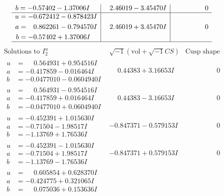 \documentclass[1p]{elsarticle_modified}
\theoremstyle{definition}
\newcommand{\I}{\sqrt{-1}}
\begin{document}
$$\begin{array}{c|c|c}
\begin{aligned}
b &= -0.57402 - 1.37006 I\end{aligned}
 & \phantom{-}2.46019 - 3.45470 I & \phantom{-0.000000 } 0 \\ \hline\begin{aligned}
u &= -0.672412 - 0.878423 I \\
a &= \phantom{-}0.862261 - 0.794570 I \\
b &= -0.57402 + 1.37006 I\end{aligned}
 & \phantom{-}2.46019 + 3.45470 I & \phantom{-0.000000 } 0\\
 \hline 
 \end{array}$$\newpage$$\begin{array}{c|c|c}  
\text{Solutions to }I^u_{2}& \I (\text{vol} + \sqrt{-1}CS) & \text{Cusp shape}\\
 \hline 
\begin{aligned}
u &= \phantom{-}0.564931 + 0.954516 I \\
a &= -0.417859 - 0.016464 I \\
b &= -0.0477010 - 0.0604940 I\end{aligned}
 & \phantom{-}0.44383 + 3.16653 I & \phantom{-0.000000 } 0 \\ \hline\begin{aligned}
u &= \phantom{-}0.564931 - 0.954516 I \\
a &= -0.417859 + 0.016464 I \\
b &= -0.0477010 + 0.0604940 I\end{aligned}
 & \phantom{-}0.44383 - 3.16653 I & \phantom{-0.000000 } 0 \\ \hline\begin{aligned}
u &= -0.452391 + 1.015630 I \\
a &= -0.71504 - 1.98517 I \\
b &= -1.13769 + 1.76536 I\end{aligned}
 & -0.847371 - 0.579153 I & \phantom{-0.000000 } 0 \\ \hline\begin{aligned}
u &= -0.452391 - 1.015630 I \\
a &= -0.71504 + 1.98517 I \\
b &= -1.13769 - 1.76536 I\end{aligned}
 & -0.847371 + 0.579153 I & \phantom{-0.000000 } 0 \\ \hline\begin{aligned}
u &= \phantom{-}0.605854 + 0.628370 I \\
a &= -0.424775 + 0.321065 I \\
b &= \phantom{-}0.075036 + 0.153636 I\end{aligned}

\end{array}$$
\end{document}
